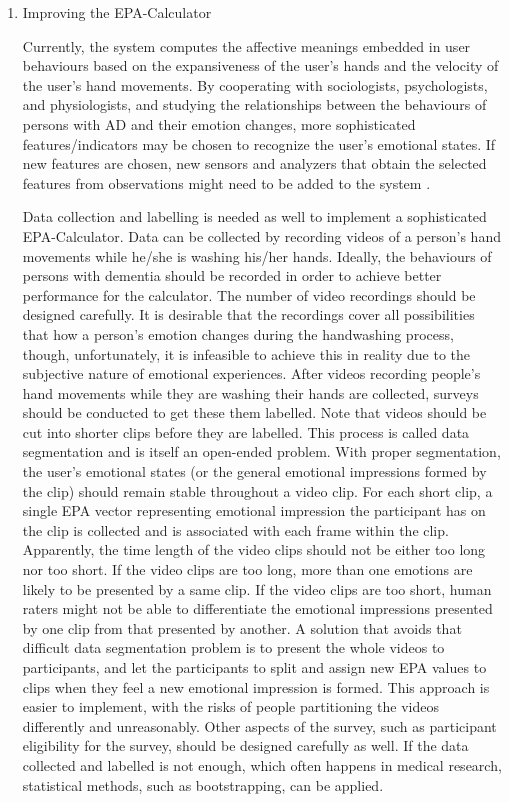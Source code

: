 \begin{enumerate}

\item{Improving the EPA-Calculator}

Currently, the system computes the affective meanings embedded in user behaviours based on the expansiveness of the user's hands and the velocity of the user's hand movements. By cooperating with sociologists, psychologists, and physiologists, and studying the relationships between the behaviours of persons with AD and their emotion changes, more sophisticated features/indicators may be chosen to recognize the user's emotional states. If new features are chosen, new sensors and analyzers that obtain the selected features from observations might need to be added to the system .

Data collection and labelling is needed as well to implement a sophisticated EPA-Calculator. Data can be collected by recording videos of a person's hand movements while he/she is washing his/her hands. Ideally, the behaviours of persons with dementia should be recorded in order to achieve better performance for the calculator. The number of video recordings should be designed carefully. It is desirable that the recordings cover all possibilities that how a person's emotion changes during the handwashing process, though, unfortunately, it is infeasible to achieve this in reality due to the subjective nature of emotional experiences. After videos recording people's hand movements while they are washing their hands are collected, surveys should be conducted to get these them labelled. Note that videos should be cut into shorter clips before they are labelled. This process is called data segmentation and is itself an open-ended problem. With proper segmentation, the user's emotional states (or the general emotional impressions formed by the clip) should remain stable throughout a video clip. For each short clip, a single EPA vector representing emotional impression the participant has on the clip is collected and is associated with each frame within the clip. Apparently, the time length of the video clips should not be either too long nor too short. If the video clips are too long, more than one emotions are likely to be presented by a same clip. If the video clips are too short, human raters might not be able to differentiate the emotional impressions presented by one clip from that presented by another. A solution that avoids that difficult data segmentation problem is to present the whole videos to participants, and let the participants to split and assign new EPA values to clips when they feel a new emotional impression is formed. This approach is easier to implement, with the risks of people partitioning the videos differently and unreasonably. Other aspects of the survey, such as participant eligibility for the survey, should be designed carefully as well. If the data collected and labelled is not enough, which often happens in medical research, statistical methods, such as bootstrapping, can be applied. 


\end{enumerate}
